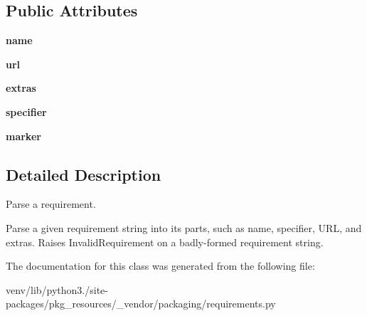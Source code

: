 \subsection*{Public Attributes}
\begin{DoxyCompactItemize}
\item 
\mbox{\label{classpkg__resources_1_1__vendor_1_1packaging_1_1requirements_1_1_requirement_aa088c4b11bc205958e53ebda55dc7720}} 
{\bfseries name}
\item 
\mbox{\label{classpkg__resources_1_1__vendor_1_1packaging_1_1requirements_1_1_requirement_a4e31ef5fb6d87065de754e8243a59538}} 
{\bfseries url}
\item 
\mbox{\label{classpkg__resources_1_1__vendor_1_1packaging_1_1requirements_1_1_requirement_a56ab857c6c2550b767ed8b0b5df560a5}} 
{\bfseries extras}
\item 
\mbox{\label{classpkg__resources_1_1__vendor_1_1packaging_1_1requirements_1_1_requirement_a5eb06f5796589cd8b83c393da8391bc5}} 
{\bfseries specifier}
\item 
\mbox{\label{classpkg__resources_1_1__vendor_1_1packaging_1_1requirements_1_1_requirement_a417ac868955523d79713efe99cad293f}} 
{\bfseries marker}
\end{DoxyCompactItemize}


\subsection{Detailed Description}
\begin{DoxyVerb}Parse a requirement.

Parse a given requirement string into its parts, such as name, specifier,
URL, and extras. Raises InvalidRequirement on a badly-formed requirement
string.
\end{DoxyVerb}
 

The documentation for this class was generated from the following file\+:\begin{DoxyCompactItemize}
\item 
venv/lib/python3./site-\/packages/pkg\+\_\+resources/\+\_\+vendor/packaging/requirements.\+py\end{DoxyCompactItemize}

